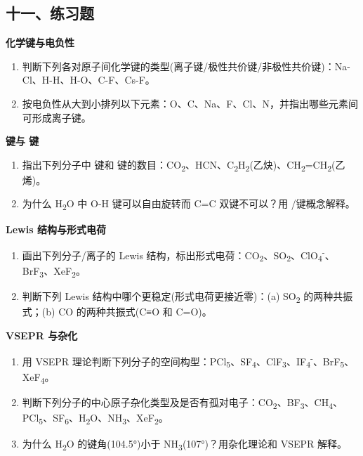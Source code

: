 \subsection{十一、练习题}\label{ux5341ux4e00ux7ec3ux4e60ux9898}

\textbf{化学键与电负性}

\begin{enumerate}
\def\labelenumi{\arabic{enumi}.}
\item
  判断下列各对原子间化学键的类型(离子键/极性共价键/非极性共价键)：Na-Cl、H-H、H-O、C-F、Cs-F。
\item
  按电负性从大到小排列以下元素：O、C、Na、F、Cl、N，并指出哪些元素间可形成离子键。
\end{enumerate}

\textbf{ 键与 \派 键}

\begin{enumerate}
\def\labelenumi{\arabic{enumi}.}
\setcounter{enumi}{2}
\item
  指出下列分子中  键和 \派 键的数目：CO\textsubscript{2}、HCN、C\textsubscript{2}H\textsubscript{2}(乙炔)、CH\textsubscript{2}=CH\textsubscript{2}(乙烯)。
\item
  为什么 H\textsubscript{2}O 中 O-H 键可以自由旋转而 C=C 双键不可以？用 /\派 键概念解释。
\end{enumerate}

\textbf{Lewis 结构与形式电荷}

\begin{enumerate}
\def\labelenumi{\arabic{enumi}.}
\setcounter{enumi}{4}
\item
  画出下列分子/离子的 Lewis 结构，标出形式电荷：CO\textsubscript{2}、SO\textsubscript{2}、ClO\textsubscript{4}\textsuperscript{-}、BrF\textsubscript{3}、XeF\textsubscript{2}。
\item
  判断下列 Lewis 结构中哪个更稳定(形式电荷更接近零)：(a) SO\textsubscript{2} 的两种共振式；(b) CO 的两种共振式(C≡O 和 C=O)。
\end{enumerate}

\textbf{VSEPR 与杂化}

\begin{enumerate}
\def\labelenumi{\arabic{enumi}.}
\setcounter{enumi}{6}
\item
  用 VSEPR 理论判断下列分子的空间构型：PCl\textsubscript{5}、SF\textsubscript{4}、ClF\textsubscript{3}、IF\textsubscript{4}\textsuperscript{-}、BrF\textsubscript{5}、XeF\textsubscript{4}。
\item
  判断下列分子的中心原子杂化类型及是否有孤对电子：CO\textsubscript{2}、BF\textsubscript{3}、CH\textsubscript{4}、PCl\textsubscript{5}、SF\textsubscript{6}、H\textsubscript{2}O、NH\textsubscript{3}、XeF\textsubscript{2}。
\item
  为什么 H\textsubscript{2}O 的键角(104.5°)小于 NH\textsubscript{3}(107°)？用杂化理论和 VSEPR 解释。
\end{enumerate}

